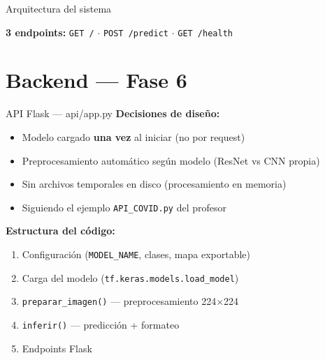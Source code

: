 \documentclass[aspectratio=169]{beamer}
\begin{document}
\begin{frame}{Arquitectura del sistema}
  \centering

  \vspace{1em}
  \begin{center}
    \small\textbf{3 endpoints:} \texttt{GET /} $\cdot$ \texttt{POST /predict} $\cdot$ \texttt{GET /health}
  \end{center}
\end{frame}

\section{Backend — Fase 6}

\begin{frame}{API Flask — api/app.py}
  \textbf{Decisiones de diseño:}
  \begin{itemize}
    \item Modelo cargado \textbf{una vez} al iniciar (no por request)
    \item Preprocesamiento automático según modelo (ResNet vs CNN propia)
    \item Sin archivos temporales en disco (procesamiento en memoria)
    \item Siguiendo el ejemplo \texttt{API\_COVID.py} del profesor
  \end{itemize}

  \vspace{0.5em}
  \textbf{Estructura del código:}
  \begin{enumerate}
    \item Configuración (\texttt{MODEL\_NAME}, clases, mapa exportable)
    \item Carga del modelo (\texttt{tf.keras.models.load\_model})
    \item \texttt{preparar\_imagen()} — preprocesamiento 224×224
    \item \texttt{inferir()} — predicción + formateo
    \item Endpoints Flask
  \end{enumerate}
\end{frame}
\end{document}
